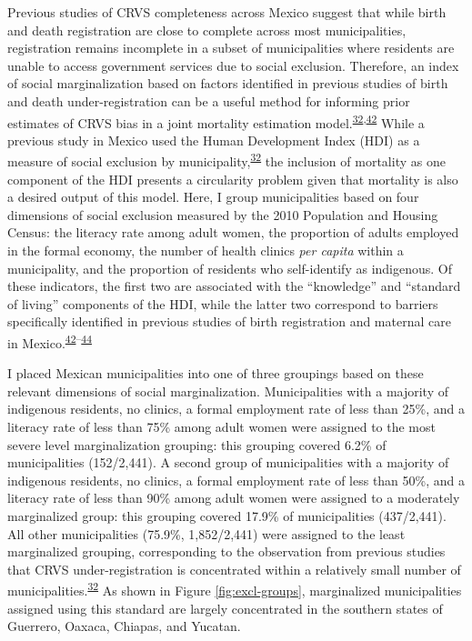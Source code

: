 \documentclass[
]{article}
\begin{document}
Previous studies of CRVS completeness across Mexico suggest that while birth and death registration are close to complete across most municipalities, registration remains incomplete in a subset of municipalities where residents are unable to access government services due to social exclusion. Therefore, an index of social marginalization based on factors identified in previous studies of birth and death under-registration can be a useful method for informing prior estimates of CRVS bias in a joint mortality estimation model.\textsuperscript{\protect\hyperlink{ref-Hernandez2012}{32},\protect\hyperlink{ref-Enciso2017}{42}} While a previous study in Mexico used the Human Development Index (HDI) as a measure of social exclusion by municipality,\textsuperscript{\protect\hyperlink{ref-Hernandez2012}{32}} the inclusion of mortality as one component of the HDI presents a circularity problem given that mortality is also a desired output of this model. Here, I group municipalities based on four dimensions of social exclusion measured by the 2010 Population and Housing Census: the literacy rate among adult women, the proportion of adults employed in the formal economy, the number of health clinics \emph{per capita} within a municipality, and the proportion of residents who self-identify as indigenous. Of these indicators, the first two are associated with the ``knowledge'' and ``standard of living'' components of the HDI, while the latter two correspond to barriers specifically identified in previous studies of birth registration and maternal care in Mexico.\textsuperscript{\protect\hyperlink{ref-Enciso2017}{42}--\protect\hyperlink{ref-Gamlin2020}{44}}

I placed Mexican municipalities into one of three groupings based on these relevant dimensions of social marginalization. Municipalities with a majority of indigenous residents, no clinics, a formal employment rate of less than 25\%, and a literacy rate of less than 75\% among adult women were assigned to the most severe level marginalization grouping: this grouping covered 6.2\% of municipalities (152/2,441). A second group of municipalities with a majority of indigenous residents, no clinics, a formal employment rate of less than 50\%, and a literacy rate of less than 90\% among adult women were assigned to a moderately marginalized group: this grouping covered 17.9\% of municipalities (437/2,441). All other municipalities (75.9\%, 1,852/2,441) were assigned to the least marginalized grouping, corresponding to the observation from previous studies that CRVS under-registration is concentrated within a relatively small number of municipalities.\textsuperscript{\protect\hyperlink{ref-Hernandez2012}{32}} As shown in Figure \ref{fig:excl-groups}, marginalized municipalities assigned using this standard are largely concentrated in the southern states of Guerrero, Oaxaca, Chiapas, and Yucatan.
\end{document}
